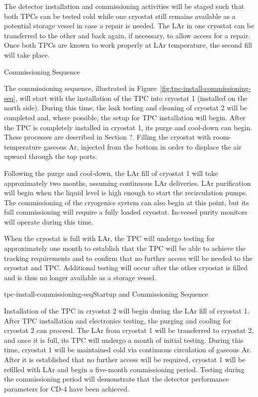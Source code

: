 The detector installation and commissioning activities will be staged such that both TPCs can be tested cold while one cryostat still remains available as a potential storage vessel in case a repair is needed. The LAr in one cryostat can be transferred to the other and back again, if necessary, to allow access for a repair. Once both TPCs are known to work properly at LAr temperature, the second fill will take place. 

Commissioning Sequence

The commissioning sequence, illustrated in Figure~\ref{fig:tpc-install-commissioning-seq}, will start with the installation of the TPC into cryostat 1 (installed on the north side). During this time, the leak testing and cleaning of cryostat 2 will be completed and, 
where possible, the setup for TPC installation will begin. After the TPC is completely installed in cryostat 1, its purge and cool-down can begin. These processes are described in Section ?. Filling the cryostat with room-
temperature gaseous Ar, injected from the bottom in order to displace the air upward through the top ports. 

Following the purge and cool-down, the LAr fill of cryostat 1 will take approximately two months, assuming continuous LAr deliveries. LAr purification will begin when the liquid level is high enough to start the recirculation 
pumps. The commissioning of the cryogenics system can also begin at this point, but its full commissioning will require a fully loaded cryostat. In-vessel purity monitors will operate during this time. 

When the cryostat is full with LAr, the TPC will undergo testing for approximately one month to establish that the TPC will be able to achieve the tracking requirements and to confirm that no further access will be needed to the 
cryostat and TPC. Additional testing will occur after the other cryostat is filled and is thus no longer available as a storage vessel. 

\begin{cdrfigure}{tpc-install-commissioning-seq}{Startup and Commissioning Sequence}
\end{cdrfigure}


Installation of the TPC in cryostat 2 will begin during the LAr fill of cryostat 1. After TPC installation and electronics testing, the purging and cooling for cryostat 2 can proceed. The LAr from cryostat 1 will be 
transferred to cryostat 2, and once it is full, its TPC will undergo a month of initial testing. During this time, cryostat 1 will be maintained cold via continuous circulation of gaseous Ar. After it is established that no further access will be required, cryostat 1 will be refilled with LAr and begin a five-month commissioning period. Testing during the commissioning period will demonstrate that the detector performance parameters for CD-4 have been achieved. 


